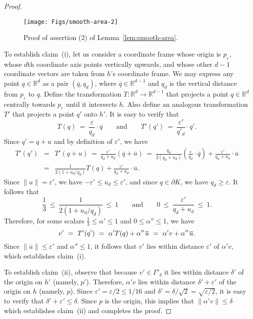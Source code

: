 \documentclass[11pt]{article}   \usepackage[letterpaper,hmargin=2.1cm,vmargin=3cm]{geometry}
\newcommand{\RE}{\mathbb{R}}    \newcommand{\ZZ}{\mathbb{Z}}    \newcommand{\eps}{\varepsilon}  \newcommand{\ST}{\,:\,}         \newcommand{\sq}{\square}
\newcommand{\inv}[1]{\frac{1}{#1}}
\renewcommand{\P}{\kern+1pt}    \newcommand{\N}{\kern-2pt}      \newcommand{\NN}{\kern-4pt}     \newcommand{\polar}[1]{\mathrm{polar}(#1)}            \newcommand{\polarX}[2]{\mathrm{polar}_{#1}(#2)}
\begin{document}
\begin{proof}
\begin{figure}[htbp]
  \centerline{\texttt{[image: Figs/smooth-area-2]}}
  \caption{Proof of assertion (2) of Lemma~\ref{lem:smooth-area}.}
  \label{fig:smooth-area-2}
\end{figure}


To establish claim~(i), let us consider a coordinate frame whose origin is $p_{\eps}$, whose $d$th coordinate axis points vertically upwards, and whose other $d-1$ coordinate vectors are taken from $h$'s coordinate frame. We may express any point $q \in \RE^d$ as a pair $(\overline{q}, q_d)$, where $\overline{q} \in \RE^{d-1}$ and $q_d$ is the vertical distance from $p_{\eps}$ to $q$. Define the transformation $T : \RE^d \rightarrow \RE^{d-1}$ that projects a point $q \in \RE^d$ centrally towards $p_{\eps}$ until it intersects $h$. Also define an analogous transformation $T'$ that projects a point $q'$ onto $h'$. It is easy to verify that
\[
	T(q) ~ = ~ \frac{\eps}{q_d} \cdot \overline{q}
	\qquad\mbox{and}\qquad
	T'(q') ~ = ~ \frac{\eps'}{q'_d} \cdot \overline{q}'.
\]
Since $q' = q + u$ and by definition of $\eps'$, we have
\begin{eqnarray*}
	T'(q')
		& = & T'(q + u)
		~ = ~ \frac{\eps'}{q_d + u_d} (\overline{q} + \overline{u}) 
		~ = ~ \frac{q_d}{2(q_d + u_d)} \left( \frac{\eps}{q_d} \cdot \overline{q} \right) + \frac{\eps'}{q_d + u_d} \cdot \overline{u} \\
		& = & \inv{2(1 + u_d/q_d)} T(q) + \frac{\eps'}{q_d + u_d} \cdot \overline{u}.
\end{eqnarray*}
Since $\|u\| = \eps'$, we have $-\eps' \le u_d \le \eps'$, and since $q \in \partial K$, we have $q_d \ge \eps$. It follows that 
\[
	\inv{3} ~\le~ \inv{2(1 + u_d/q_d)} ~\le~ 1
	\qquad\mbox{and}\qquad
	0 ~\le~ \frac{\eps'}{q_d + u_d} ~\le~ 1.
\]
Therefore, for some scalars $\inv{3} \le \alpha' \le 1$ and $0 \le \alpha'' \le 1$, we have
\[
	v'
		~ = ~ T'(q')
		~ = ~ \alpha' T(q) + \alpha'' \P \overline{u}
		~ = ~ \alpha' v + \alpha'' \P \overline{u}.
\]
Since $\|\overline{u}\| \le \eps'$ and $\alpha'' \le 1$, it follows that $v'$ lies within distance $\eps'$ of $\alpha' v$, which establishes claim~(i). 

To establish claim~(ii), observe that because $v' \in \Gamma'_{\delta}$ it lies within distance $\delta'$ of the origin on $h'$ (namely, $p'$). Therefore, $\alpha' v$ lies within distance $\delta' + \eps'$ of the origin on $h$ (namely, $p$). Since $\eps' = \eps/2 \le 1/16$ and $\delta' = \delta/\sqrt{2} = \sqrt{\eps/2}$, it is easy to verify that $\delta' + \eps' \le \delta$. Since $p$ is the origin, this implies that $\|\alpha' v\| \le \delta$ which establishes claim~(ii) and completes the proof.
\end{proof}
\end{document}

